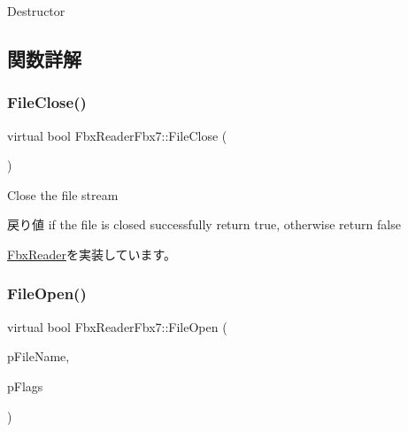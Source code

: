 Destructor 

\subsection{関数詳解}
\mbox{\label{class_fbx_reader_fbx7_a06f5323e8d483a1103d54fc53cceadc9}} 
\subsubsection{\texorpdfstring{File\+Close()}{FileClose()}}
{\footnotesize\ttfamily virtual bool Fbx\+Reader\+Fbx7\+::\+File\+Close (\begin{DoxyParamCaption}{ }\end{DoxyParamCaption})\hspace{0.3cm}{\ttfamily [virtual]}}

Close the file stream \begin{DoxyReturn}{戻り値}
if the file is closed successfully return {\ttfamily true}, otherwise return {\ttfamily false} 
\end{DoxyReturn}


\hyperlink{class_fbx_reader_a327df94e5c24315fc5cbcedf0e7bb615}{Fbx\+Reader}を実装しています。

\mbox{\label{class_fbx_reader_fbx7_a003c93fdf81dc99380d0276e7643ac26}} 
\subsubsection{\texorpdfstring{File\+Open()}{FileOpen()}\hspace{0.1cm}{\footnotesize\ttfamily [1/4]}}
{\footnotesize\ttfamily virtual bool Fbx\+Reader\+Fbx7\+::\+File\+Open (\begin{DoxyParamCaption}\item[{char $\ast$}]{p\+File\+Name,  }\item[{\hyperlink{class_fbx_reader_a1a14bd907bcda7dd48ba9b0a6236b7b8}{E\+File\+Open\+Special\+Flags}}]{p\+Flags }\end{DoxyParamCaption})\hspace{0.3cm}{\ttfamily [virtual]}}

